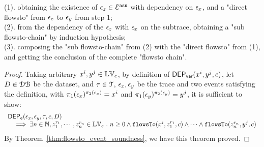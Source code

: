 (1). obtaining the existence of $\mathtt{\epsilon}_z \in \mathcal{E}^{\mathtt{{asn}}} $ with dependency on $\mathtt{\epsilon}_x$, and a "direct flowsto" from $\mathtt{\epsilon}_z$ to $\mathtt{\epsilon}_y$
 from step 1;
 \\
(2). from the dependency of the $\mathtt{\epsilon}_z$ with $\mathtt{\epsilon}_x$ on the subtrace,
 obtaining a "sub flowsto-chain" by induction  hypothesis;
 \\
(3). composing the "sub flowsto-chain" from (2) with the  "direct flowsto" from (1), and getting the conclusion of
 the complete "flowsto chain".
%
\begin{proof}
  Taking arbitrary $x^i, y^j \in \mathbb{LV}_c$,
%
%
by definition of $\mathsf{DEP_{var}}(x^i, y^j, {c})$, 
let $D \in \mathcal{DB}$ be the dataset,
and $\mathtt{\tau} \in \mathcal{T}$, $\mathtt{\epsilon}_x, \mathtt{\epsilon}_y$ be the trace and two events satisfying the definition, 
with $\pi_1(\mathtt{\epsilon}_x)^{\pi_2(\mathtt{\epsilon}_x)} = x^i$ and $\pi_1(\mathtt{\epsilon}_y)^{\pi_2(\mathtt{\epsilon}_y)} = y^j$,  it is sufficient to show:
$$
\begin{array}{l}
  \mathsf{DEP_{\mathtt{e}}}(\mathtt{\epsilon}_x, \mathtt{\epsilon}_y, \mathtt{\tau}, c, D) 
  \\ \quad 
  \implies 
  \exists n \in \mathbb{N}, z_1^{r_1}, \cdots, z_n^{r_n} \in \mathbb{LV}_{{c}} ~.~ n \geq 0 \land
  \mathtt{flowsTo}(x^i,  z_1^{r_1}, c) 
  \land \cdots \land \mathtt{flowsTo}(z_n^{r_n}, y^j, c) 
\end{array}
$$
%
By Theorem~\ref{thm:flowsto_event_soundness}, we have this theorem proved.
\end{proof}